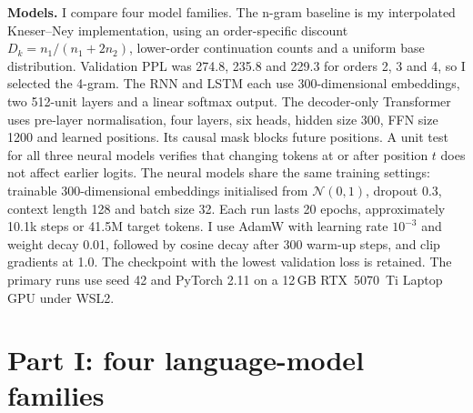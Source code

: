\documentclass[10pt]{article}
\begin{document}
\textbf{Models.} I compare four model families. The n-gram baseline is my interpolated Kneser--Ney implementation,
using an order-specific discount $D_k=n_1/(n_1+2n_2)$, lower-order continuation counts and a uniform base
distribution. Validation PPL was 274.8, 235.8 and 229.3 for orders 2, 3 and 4, so I selected the 4-gram. The RNN
and LSTM each use 300-dimensional embeddings, two 512-unit layers and a linear softmax output. The decoder-only
Transformer uses pre-layer normalisation, four layers, six heads, hidden size 300, FFN size 1200 and learned
positions. Its causal mask blocks future positions. A unit test for all three neural models verifies that changing
tokens at or after position $t$ does not affect earlier logits. The neural models share the same training settings:
trainable 300-dimensional embeddings initialised from $\mathcal N(0,1)$, dropout 0.3, context length 128 and batch
size 32. Each run lasts 20 epochs, approximately 10.1k steps or 41.5M target tokens. I use AdamW with learning rate
$10^{-3}$ and weight decay 0.01, followed by cosine decay after 300 warm-up steps, and clip gradients at 1.0. The
checkpoint with the lowest validation loss is retained. The primary runs use seed 42 and PyTorch 2.11 on a 12\,GB
RTX~5070~Ti Laptop GPU under WSL2.

\section{Part I: four language-model families}
\begin{table}[h]
\centering\small\setlength{\tabcolsep}{4pt}
\\[3pt]

\caption{Part I. Top: prediction quality and fit. \emph{3 seeds}: mean $\pm$ std of test PPL over seeds 42, 1, 2.
\emph{Train CE}: training split re-scored in eval mode (no dropout) with the selected weights, so that \emph{Gap}
= val CE $-$ train CE compares like with like. Bottom: cost and generation. \emph{Train time}: full 20-epoch budget, all three models re-trained in lockstep
(alternating order per epoch) so they share the same thermal conditions. \emph{Train/Infer k tok/s}:
round-robin benchmark (5 rounds, median; batch 32$\times$128). \emph{Gen}: model-only greedy decoding at batch 1,
120 new tokens, median of 5 round-robin rounds; \emph{recomp.} re-encodes the whole context each step,
\emph{increm.} carries the recurrent state or a key/value cache. \emph{Rep-3}: share of repeated trigrams in 40-token greedy
continuations; \emph{Dist-2}: distinct bigrams in top-$k$ samples (5 prompts $\times$10).
$^\dagger$stored $n$-gram count entries, not trainable parameters.}
\label{tab:p1}
\end{table}
\end{document}
